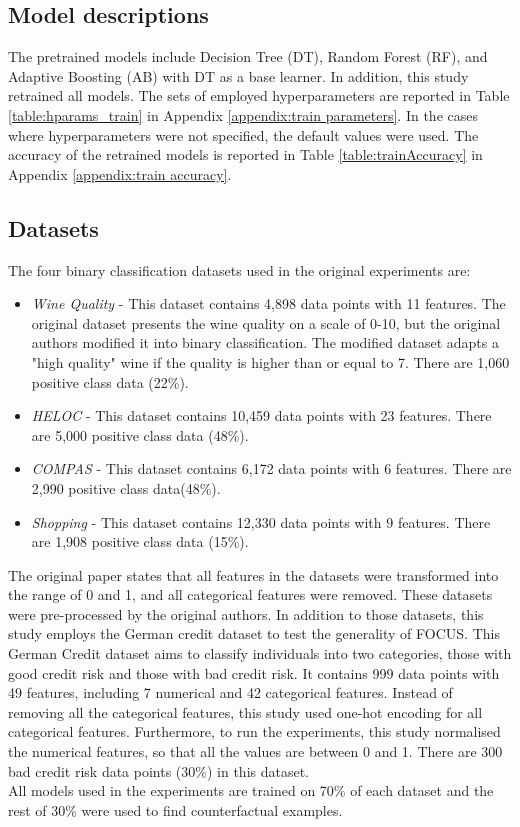 \subsection{Model descriptions}
\label{sec:model descriptions}
The pretrained models include Decision Tree (DT), Random Forest (RF), and Adaptive Boosting (AB) with DT as a base learner.
In addition, this study retrained all models. The sets of employed hyperparameters are reported in Table \ref{table:hparams_train} in Appendix \ref{appendix:train parameters}. In the cases where hyperparameters were not specified, the default values were used. The accuracy of the retrained models is reported in Table \ref{table:trainAccuracy} in Appendix \ref{appendix:train accuracy}.

\subsection{Datasets}
The four binary classification datasets used in the original experiments are:

\begin{itemize}
    \item \textit{Wine Quality} \cite{cortez2009modeling} - This dataset contains 4,898 data points with 11 features. The original dataset presents the wine quality on a scale of 0-10, but the original authors modified it into binary classification. The modified dataset adapts a "high quality" wine if the quality is higher than or equal to 7. There are 1,060 positive class data (22\%).
    \item \textit{HELOC} \cite{fico2017} - This dataset contains 10,459 data points with 23 features. There are 5,000 positive class data (48\%).
    \item \textit{COMPAS} \cite{ofer2017compas} - This dataset contains 6,172 data points with 6 features. There are 2,990 positive class data(48\%).
    \item \textit{Shopping} \cite{sakar2019real} - This dataset contains 12,330 data points with 9 features. There are 1,908 positive class data (15\%).
\end{itemize}
The original paper states that all features in the datasets were transformed into the range of 0 and 1, and all categorical features were removed. These datasets were pre-processed by the original authors.
In addition to those datasets, this study employs the German credit dataset to test the generality of FOCUS. This German Credit dataset aims to classify individuals into two categories, those with good credit risk and those with bad credit risk. It contains 999 data points with 49 features, including 7 numerical and 42 categorical features. Instead of removing all the categorical features, this study used one-hot encoding for all categorical features. Furthermore, to run the experiments, this study normalised the numerical features, so that all the values are between 0 and 1. There are 300 bad credit risk data points (30\%) in this dataset.\\
All models used in the experiments are trained on 70\% of each dataset and the rest of 30\% were used to find counterfactual examples. 

